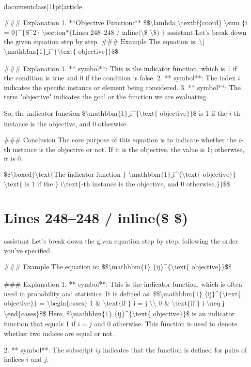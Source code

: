 \\documentclass[11pt]{article}
\begin{document}
### Explanation
1. **Objective Function:**
   \[
   \lambda_\textbf{coord}
   \sum_{i = 0}^{S^2}


\section*{Lines 248–248 / inline(\$ \$) }
assistant
Let's break down the given equation step by step.

### Example
The equation is:
\[
\mathbbm{1}_i^{\text{ objective}}
\]

### Explanation
1. ** symbol**: This is the indicator function, which is 1 if the condition is true and 0 if the condition is false.
2. ** symbol**: The index \( i \) indicates the specific instance or element being considered.
3. ** symbol**: The term "objective" indicates the goal or the function we are evaluating.

So, the indicator function \(\mathbbm{1}_i^{\text{ objective}}\) is 1 if the \(i\)-th instance is the objective, and 0 otherwise.

### Conclusion
The core purpose of this equation is to indicate whether the \(i\)-th instance is the objective or not. If it is the objective, the value is 1; otherwise, it is 0.

\[
\boxed{\text{The indicator function } \mathbbm{1}_i^{\text{ objective}} \text{ is 1 if the } i\text{-th instance is the objective, and 0 otherwise.}}
\]


\section*{Lines 248–248 / inline(\$ \$) }
assistant
Let's break down the given equation step by step, following the order you've specified.

### Example
The equation is:
\[
\mathbbm{1}_{ij}^{\text{ objective}}
\]

### Explanation
1. ** symbol**: This is the indicator function, which is often used in probability and statistics. It is defined as:
   \[
   \mathbbm{1}_{ij}^{\text{ objective}} = 
   \begin{cases} 
   1 & \text{if } i = j \\
   0 & \text{if } i \neq j 
   \end{cases}
   \]
   Here, \( \mathbbm{1}_{ij}^{\text{ objective}} \) is an indicator function that equals 1 if \( i = j \) and 0 otherwise. This function is used to denote whether two indices are equal or not.

2. ** symbol**: The subscript \(ij\) indicates that the function is defined for pairs of indices \(i\) and \(j\).

\]
\end{document}
